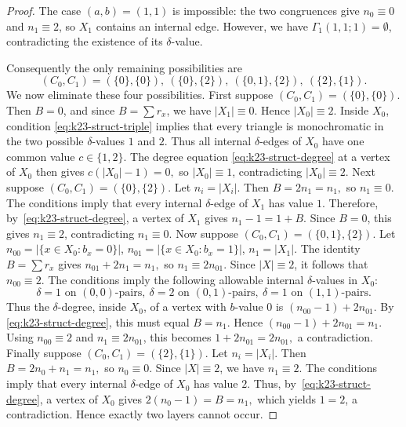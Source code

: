 ﻿\documentclass[11pt]{article}
\numberwithin{equation}{section}
\theoremstyle{remark}
\begin{document}
\begin{proof}
    The case \((a,b)=(1,1)\) is impossible: the two congruences give
    \(n_0\equiv0\) and \(n_1\equiv2\), so \(X_1\) contains an internal edge.
    However, we have $\Gamma_1(1,1;1)=\emptyset$, contradicting the existence of its \(\delta\)-value.

    Consequently the only remaining possibilities are
    \[
        (C_0,C_1)=(\{0\},\{0\}),\
        (\{0\},\{2\}),\
        (\{0,1\},\{2\}),\
        (\{2\},\{1\}).
    \]
    We now eliminate these four possibilities.
    First suppose
    \((C_0,C_1)=(\{0\},\{0\}).\)
    Then \(B=0\), and since \(B=\sum r_x\), we have \(|X_1|\equiv 0\). Hence \(|X_0|\equiv 2\). Inside \(X_0\), condition \eqref{eq:k23-struct-triple} implies that every triangle is monochromatic in the two possible \(\delta\)-values \(1\) and \(2\). Thus all internal \(\delta\)-edges of \(X_0\) have one common value \(c\in\{1,2\}\). The degree equation \eqref{eq:k23-struct-degree} at a vertex of \(X_0\) then gives
    \(c(|X_0|-1)=0,\)
    so \(|X_0|\equiv 1\), contradicting \(|X_0|\equiv 2\).
    Next suppose
    \((C_0,C_1)=(\{0\},\{2\}).\)
    Let \(n_i=|X_i|\). Then
    \(B=2n_1=n_1,\)
    so \(n_1\equiv 0\). The conditions imply that every internal \(\delta\)-edge of \(X_1\) has value \(1\). Therefore, by~\eqref{eq:k23-struct-degree}, a vertex of \(X_1\) gives
    \(n_1-1=1+B.\)
    Since \(B=0\), this gives \(n_1\equiv 2\), contradicting \(n_1\equiv 0\).
    Now suppose
    \((C_0,C_1)=(\{0,1\},\{2\}).\)
    Let
    \(n_{00}=|\{x\in X_0:b_x=0\}|\), \(n_{01}=|\{x\in X_0:b_x=1\}|\), \(n_1=|X_1|.\)
    The identity \(B=\sum r_x\) gives
    \(n_{01}+2n_1=n_1,\)
    so
    \(n_1\equiv 2n_{01}.\)
    Since \(|X|\equiv 2\), it follows that
    \(n_{00}\equiv 2.\)
    The conditions imply the following allowable internal \(\delta\)-values in \(X_0\):
    \[\delta=1 \text{ on } (0,0)\text{-pairs},\
        \delta=2 \text{ on } (0,1)\text{-pairs},\
        \delta=1 \text{ on } (1,1)\text{-pairs}.
    \]
    Thus the \(\delta\)-degree, inside \(X_0\), of a vertex with \(b\)-value \(0\) is
    \((n_{00}-1)+2n_{01}.\)
    By \eqref{eq:k23-struct-degree}, this must equal \(B=n_1\). Hence
    \((n_{00}-1)+2n_{01}=n_1.\)
    Using \(n_{00}\equiv 2\) and \(n_1\equiv 2n_{01}\), this becomes
    \(1+2n_{01}=2n_{01},\)
    a contradiction.
    Finally suppose
    \((C_0,C_1)=(\{2\},\{1\}).\)
    Let \(n_i=|X_i|\). Then
    \(B=2n_0+n_1=n_1,\)
    so \(n_0\equiv 0\). Since \(|X|\equiv 2\), we have \(n_1\equiv 2\). The conditions imply that every internal \(\delta\)-edge of \(X_0\) has value \(2\). Thus, by~\eqref{eq:k23-struct-degree}, a vertex of \(X_0\) gives
    \(2(n_0-1)=B=n_1,\) which yields \(1=2\), a contradiction. Hence exactly two layers cannot occur.


\end{proof}
\end{document}
